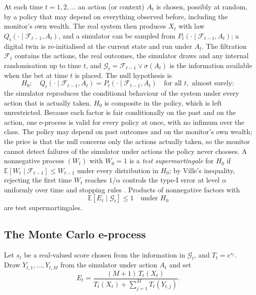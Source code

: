\documentclass[12pt]{article}
\newcommand{\E}{\mathbb{E}}
\newcommand{\F}{\mathcal{F}}
\newcommand{\G}{\mathcal{G}}
\theoremstyle{remark}
\begin{document}
At each time $t = 1, 2, \ldots$ an action (or context) $A_t$ is chosen,
possibly at random, by a policy that may depend on everything observed
before, including the monitor's own wealth. The real system then produces $X_t$ with law $Q_t(\cdot \mid \F_{t-1}, A_t)$, and a simulator can be sampled from $P_t(\cdot \mid \F_{t-1}, A_t)$; a digital twin is re-initialised at the current state and run under $A_t$. The
filtration $\F_t$ contains the actions, the real outcomes, the simulator draws
and any internal randomisation up to time $t$, and
$\G_t = \F_{t-1} \vee \sigma(A_t)$ is the information available when the bet
at time $t$ is placed. The null hypothesis is
\[
H_0:\quad Q_t(\cdot \mid \F_{t-1}, A_t) = P_t(\cdot \mid \F_{t-1}, A_t)
\quad \text{for all } t, \text{ almost surely}:
\]
the simulator reproduces the conditional behaviour of the system under every
action that is actually taken. $H_0$ is composite in the policy, which is left
unrestricted. Because each factor is fair conditionally on the past and on
the action, one e-process is valid for every policy at once, with no infimum
over the class. The policy may depend
on past outcomes and on the monitor's own wealth; the price is that
the null concerns only the actions actually taken, so the monitor cannot
detect failures of the simulator under actions the policy never chooses. A nonnegative process $(W_t)$ with $W_0 = 1$ is a \emph{test
supermartingale} for $H_0$ if $\E[W_t \mid \F_{t-1}] \le W_{t-1}$ under every
distribution in $H_0$; by Ville's inequality, rejecting the first time $W_t$
reaches $1/\alpha$ controls the type-I error at level $\alpha$ uniformly over
time and stopping rules \citep{ramdas2023game,grunwald2024safe}. Products of
nonnegative factors with
\begin{equation}\label{eq:fair}
\E[E_t \mid \G_t] \le 1 \quad \text{under } H_0
\end{equation}
are test supermartingales.

\subsection{The Monte Carlo e-process}

Let $s_t$ be a real-valued score chosen from the information in $\G_t$, and
$T_t = e^{s_t}$. Draw $Y_{t,1}, \ldots, Y_{t,M}$ from the simulator under
action $A_t$ and set
\begin{equation}\label{eq:mc}
E_t = \frac{(M+1)\, T_t(X_t)}{T_t(X_t) + \sum_{j=1}^{M} T_t(Y_{t,j})}.
\end{equation}
\end{document}
